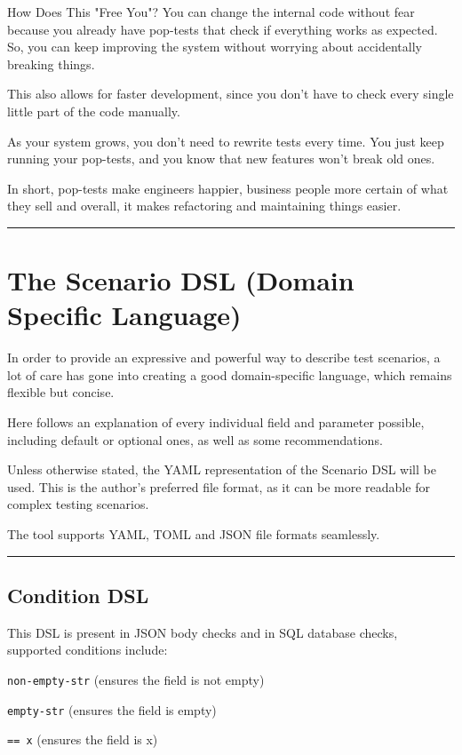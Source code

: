 \documentclass[11pt]{article}
\begin{document}
How Does This "Free You"? You can change the internal code without fear because you already have pop-tests that check if everything works as expected. So, you can keep improving the system without worrying about accidentally breaking things.

This also allows for faster development, since you don’t have to check every single little part of the code manually.

As your system grows, you don’t need to rewrite tests every time. You just keep running your pop-tests, and you know that new features won’t break old ones.

In short, pop-tests make engineers happier, business people more certain of what they sell and overall, it makes refactoring and maintaining things easier.

\noindent\rule{\textwidth}{0.5pt}

\section{The Scenario DSL (Domain Specific Language)}
\label{sec:org7218ca1}

In order to provide an expressive and powerful way to describe test scenarios, a lot of care has gone into creating a good domain-specific language, which remains flexible but concise.

Here follows an explanation of every individual field and parameter possible, including default or optional ones, as well as some recommendations.

Unless otherwise stated, the YAML representation of the Scenario DSL will be used. This is the author's preferred file format, as it can be more readable for complex testing scenarios.

The tool supports YAML, TOML and JSON file formats seamlessly.


\noindent\rule{\textwidth}{0.5pt}

\subsection{Condition DSL}
\label{sec:orge8ccbe7}

This DSL is present in JSON body checks and in SQL database checks, supported conditions include:

\texttt{non-empty-str} (ensures the field is not empty)

\texttt{empty-str} (ensures the field is empty)

\texttt{== x} (ensures the field is x)
\end{document}
